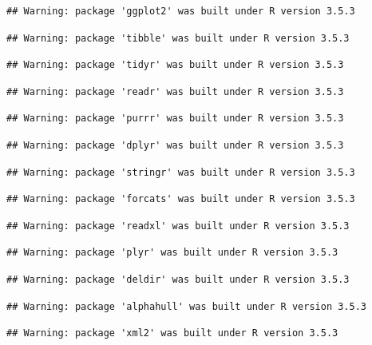 \documentclass[]{article}
\begin{document}
\begin{verbatim}
## Warning: package 'ggplot2' was built under R version 3.5.3
\end{verbatim}

\begin{verbatim}
## Warning: package 'tibble' was built under R version 3.5.3
\end{verbatim}

\begin{verbatim}
## Warning: package 'tidyr' was built under R version 3.5.3
\end{verbatim}

\begin{verbatim}
## Warning: package 'readr' was built under R version 3.5.3
\end{verbatim}

\begin{verbatim}
## Warning: package 'purrr' was built under R version 3.5.3
\end{verbatim}

\begin{verbatim}
## Warning: package 'dplyr' was built under R version 3.5.3
\end{verbatim}

\begin{verbatim}
## Warning: package 'stringr' was built under R version 3.5.3
\end{verbatim}

\begin{verbatim}
## Warning: package 'forcats' was built under R version 3.5.3
\end{verbatim}

\begin{verbatim}
## Warning: package 'readxl' was built under R version 3.5.3
\end{verbatim}

\begin{verbatim}
## Warning: package 'plyr' was built under R version 3.5.3
\end{verbatim}

\begin{verbatim}
## Warning: package 'deldir' was built under R version 3.5.3
\end{verbatim}

\begin{verbatim}
## Warning: package 'alphahull' was built under R version 3.5.3
\end{verbatim}

\begin{verbatim}
## Warning: package 'xml2' was built under R version 3.5.3
\end{verbatim}
\end{document}
